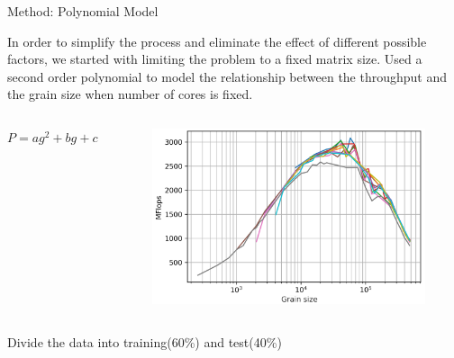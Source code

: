 \documentclass[10pt]{beamer}
\begin{document}

\begin{frame}{Method: Polynomial Model}
	\begin{outline}
		
		In order to simplify the process and eliminate the effect of different possible factors, we started with limiting the problem to a fixed matrix size.	
		\1Used a second order polynomial to model the relationship between the throughput and the grain size when number of cores is fixed.
		\begin{columns}		
		 \centering$P=ag^2+bg+c$ 
		 \begin{figure}[]
		 \includegraphics[scale=0.15]{images/fig6_cropped.png}
		 \end{figure}
		 
		\end{columns}
	\1Divide the data into training(60\%) and test(40\%)
	\end{outline}
\end{frame}
\end{document}
